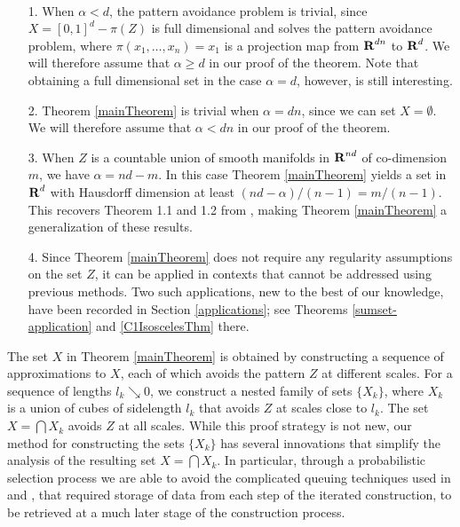 \begin{remarks}
	\
	\begin{enumerate}
		\item[1.] When $\alpha < d$, the pattern avoidance problem is trivial, since $X = [0,1]^d - \pi(Z)$ is full dimensional and solves the pattern avoidance problem, where $\pi(x_1, \dots, x_n) = x_1$ is a projection map from $\operatorname{\mathbf{R}}^{dn}$ to $\operatorname{\mathbf{R}}^d$. We will therefore assume that $\alpha \geq d$ in our proof of the theorem. Note that obtaining a full dimensional set in the case $\alpha = d$, however, is still interesting.

		\item[2.] Theorem \ref{mainTheorem} is trivial when $\alpha = dn$, since we can set $X = \emptyset$. We will therefore assume that $\alpha < dn$ in our proof of the theorem.

		\item[3.] When $Z$ is a countable union of smooth manifolds in $\operatorname{\mathbf{R}}^{nd}$ of co-dimension $m$, we have $\alpha = nd - m$. In this case Theorem \ref{mainTheorem} yields a set in $\operatorname{\mathbf{R}}^d$ with Hausdorff dimension at least $(nd - \alpha)/(n-1) = m/(n-1)$. This recovers Theorem 1.1 and 1.2 from \cite{MalabikaRob}, making Theorem \ref{mainTheorem} a generalization of these results.

		\item[4.] Since Theorem \ref{mainTheorem} does not require any regularity assumptions on the set $Z$, it can be applied in contexts that cannot be addressed using previous methods. Two such applications, new to the best of our knowledge, have been recorded in Section \ref{applications}; see Theorems \ref{sumset-application} and \ref{C1IsoscelesThm} there.
	\end{enumerate}
\end{remarks}

The set $X$ in Theorem \ref{mainTheorem} is obtained by constructing a sequence of approximations to $X$, each of which avoids the pattern $Z$ at different scales. For a sequence of lengths $l_k \searrow 0$, we construct a nested family of sets $\{ X_k \}$, where $X_k$ is a union of cubes of sidelength $l_k$ that avoids $Z$ at scales close to $l_k$. The set $X=\bigcap X_k$ avoids $Z$ at all scales. While this proof strategy is not new, our method for constructing the sets $\{ X_k \}$ has several innovations that simplify the analysis of the resulting set $X = \bigcap X_k$. In particular, through a probabilistic selection process we are able to avoid the complicated queuing techniques used in \cite{KeletiDimOneSet} and \cite{MalabikaRob}, that required storage of data from each step of the iterated construction, to be retrieved at a much later stage of the construction process.

